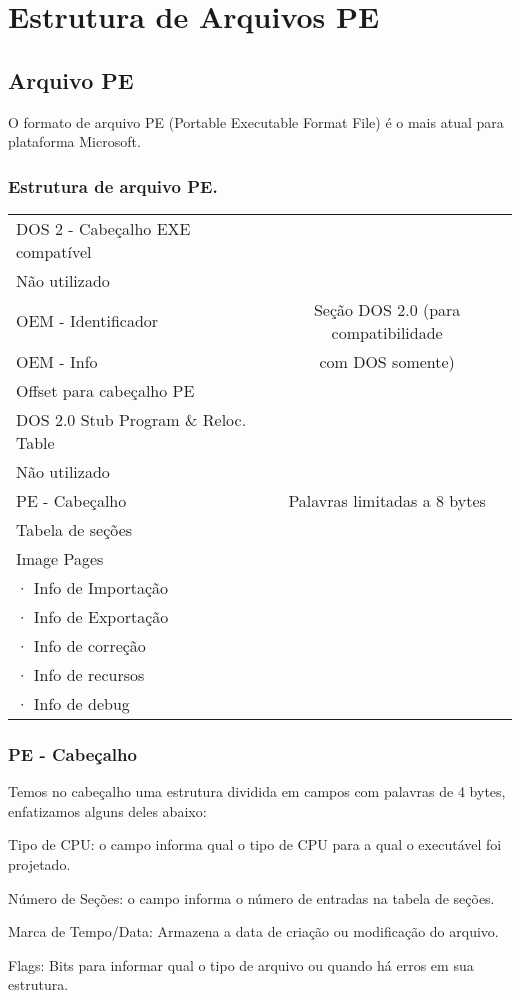
\chapter{Estrutura de Arquivos PE}
\label{ap:A}  
\section{Arquivo PE}

O formato de arquivo PE (Portable Executable Format File) é o mais atual para plataforma Microsoft.


\subsection{Estrutura de arquivo PE.}
\begin{list}{}
\item {\begin{tabular}{|l|c|}
\hline 
DOS 2 - Cabeçalho EXE compatível  & \tabularnewline
\cline{1-1} 
Não utilizado  & \tabularnewline
\cline{1-1} 
OEM - Identificador  & Seção DOS 2.0 (para compatibilidade \tabularnewline
OEM - Info  & com DOS somente)\tabularnewline
Offset para cabeçalho PE & \tabularnewline
\cline{1-1} 
DOS 2.0 Stub Program \& Reloc. Table  & \tabularnewline
\hline 
Não utilizado & \tabularnewline
\hline 
PE - Cabeçalho & Palavras limitadas a 8 bytes\tabularnewline
\hline 
Tabela de seções & \tabularnewline
\hline
Image Pages  & \tabularnewline
· Info de Importação & \tabularnewline
· Info de Exportação  & \tabularnewline
· Info de correção & \tabularnewline
· Info de recursos & \tabularnewline
· Info de debug & \tabularnewline
\hline
\end{tabular}}
\end{list}

\subsection{PE - Cabeçalho}


Temos no cabeçalho uma estrutura dividida em campos com palavras
de 4 bytes, enfatizamos alguns deles abaixo:


Tipo de CPU: o campo informa qual o tipo de CPU para a qual o executável
foi projetado.


Número de Seções: o campo informa o número de entradas na tabela
de seções.


Marca de Tempo/Data: Armazena a data de criação ou modificação do
arquivo.


Flags: Bits para informar qual o tipo de arquivo ou quando há erros
em sua estrutura.


